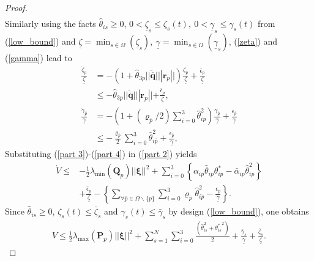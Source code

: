 \documentclass[AMA,STIX1COL,sort, compress]{WileyNJD-v2}
\begin{document}
\begin{proof}
\begin{align}
	\end{align}
	Similarly using the facts $\hat{\theta}_{is} \geq 0$, $0< \underline{\zeta}_{s} \leq \zeta_{s}(t),~0< \underline{\gamma}_{s} \leq \gamma_{s}(t)$ from (\ref{low_bound}) and $\underline{\zeta}=\min_{s \in \Omega} ( \underline{\zeta}_{s} ),~\underline{\gamma}=\min_{s \in \Omega} ( \underline{\gamma}_{s} )$, (\ref{zeta}) and (\ref{gamma}) lead to
	\begin{align}
	\frac{\dot{\zeta}_{ p}}{\underline{\zeta}} &=   - \left(1 + \hat{\theta}_{3p} || \ddot{\overline{\mathbf q}} || | \mathbf{r}_p || \right) \frac{{\zeta}_{p}}{\underline{\zeta} } +  \frac{\bar{\epsilon}_{ p}}{\underline{\zeta} }  \nonumber\\ 
	& \leq   - \hat{\theta}_{3p} || \ddot{\overline{\mathbf q}} || | \mathbf{r}_p ||  +  \frac{\bar{\epsilon}_{ p}}{\underline{\zeta} }, \label{part 4_1}\\
	\frac{\dot{\gamma}_{\overline p}}{\underline{\gamma}} &=   - \left(1 + (\varrho_{\overline{p}}/2) \sum_{i=0}^{3}{\hat{\theta}}_{i \overline p}^2   \right) \frac{{\gamma}_{\overline p}}{\underline{\gamma} } +  \frac{{\epsilon}_{\overline p}}{\underline{\gamma} } \nonumber\\ 
	& \leq   - \frac{\varrho_{\overline{p}}}{2} \sum_{i=0}^{3}{\hat{\theta}}_{i \overline p}^2  +  \frac{{\epsilon}_{\overline p}}{\underline{\gamma} }, \label{part 4} 
	\end{align}
	Substituting (\ref{part 3})-(\ref{part 4}) in (\ref{part 2}) yields
	\begin{align}
	\dot{V}\leq &   - \frac{1}{2} \lambda_{\min}(\mathbf Q_p) || \boldsymbol{\xi} ||^2  +\sum_{i=0}^{3} \left \lbrace\alpha_{ip}{\hat{\theta}}_{ip}{\theta}_{ip}^{*} -\bar{\alpha}_{ip}{\hat{\theta}}_{ip}^2 \right  \rbrace \nonumber\\
	&+\frac{\bar{\epsilon}_{ p}}{\underline{\zeta} }  - \left\lbrace \sum_{\forall \overline{p}\in \Omega \backslash \lbrace p \rbrace} \sum_{i=0}^{3} \varrho_{\overline{p}} {\hat{\theta}}_{i \overline p}^2  -  \frac{{\epsilon}_{\overline p}}{\underline{\gamma} } \right \rbrace. \label{part 5}
	\end{align}
	Since $\hat{\theta}_{is} \geq 0$, $\zeta_{s}(t) \leq \bar{\zeta}_{s}$ and $\gamma_{s}(t) \leq \bar{\gamma}_{s}$ by design (\ref{low_bound}), one obtains
	\begin{align}
	V \leq  \frac{1}{2} \lambda_{\max}( \mathbf{P}_{p} ) ||\boldsymbol{\xi}||^2  + \sum_{s=1}^{N} \sum_{i=0}^{3}\frac{(\hat{\theta}_{is}^2 + {\theta_{is}^{*}}^2)}{2}+ \frac{\bar{\gamma}_{s}}{ \underline{\gamma}}+ \frac{\bar{\zeta}_{s}}{ \underline{\zeta}}. \label{lyap_up_bound}

\end{align}
\end{proof}
\end{document}
